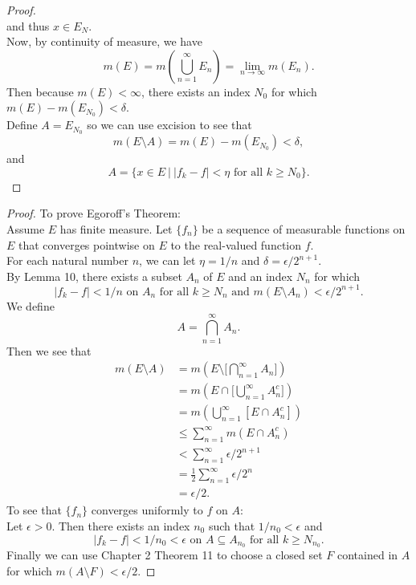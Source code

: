\begin{flushleft}
\begin{proof}
\[        \]
        and thus $x\in E_N$.
        \\Now, by continuity of measure, we have
        \[
            m(E)=m(\bigcup_{n=1}^\infty E_n)=\lim_{n\to\infty}m(E_n).
        \]
        Then because $m(E)<\infty$, there exists an index $N_0$ for which $m(E)-m(E_{N_0})<\delta$.
        \\Define $A=E_{N_0}$ so we can use excision to see that
        \[
            m(E\setminus A)=m(E)-m(E_{N_0})<\delta,
        \]
        and 
        \[
            A=\{x\in E\ |\ |f_k-f|<\eta\text{ for all }k\ge N_0\}.
        \]
    \end{proof}
    \begin{proof}
        To prove Egoroff's Theorem:\\
        Assume $E$ has finite measure. Let $\{f_n\}$ be a sequence of measurable functions on $E$ that converges pointwise on $E$ to the real-valued function $f$.
        \\For each natural number $n$, we can let $\eta=1/n$ and $\delta=\epsilon/2^{n+1}$.
        \\By Lemma 10, there exists a subset $A_n$ of $E$ and an index $N_n$ for which
        \[
            |f_k-f|<1/n\text{ on }A_n\text{ for all }k\ge N_n\text{ and }m(E\setminus A_n)<\epsilon/2^{n+1}.    
        \]
        We define 
        \[
            A=\bigcap_{n=1}^\infty A_n.
        \]
        Then we see that
        \begin{align*}
            m(E\setminus A)&=m(E\setminus \biggl[\bigcap_{n=1}^\infty A_n\biggr])\\
            &=m(E\cap \biggl[\bigcup_{n=1}^\infty A_n^c\biggr])\\
            &=m(\bigcup_{n=1}^\infty [E\cap A_n^c])\\
            &\le \sum_{n=1}^\infty m(E\cap A_n^c)\\
            &< \sum_{n=1}^\infty \epsilon/2^{n+1}\\
            &= \frac{1}{2} \sum_{n=1}^\infty \epsilon/2^n\\
            &=\epsilon/2.
        \end{align*}
        To see that $\{f_n\}$ converges uniformly to $f$ on $A$:
        \\Let $\epsilon>0$. Then there exists an index $n_0$ such that $1/n_0<\epsilon$ and 
        \[
            |f_k-f|<1/n_0<\epsilon\text{ on }A\subseteq A_{n_0}\text{ for all }k\ge N_{n_0}.
        \]
        Finally we can use Chapter 2 Theorem 11 to choose a closed set $F$ contained in $A$ for which $m(A\setminus F)<\epsilon/2$.

\end{proof}
\end{flushleft}
